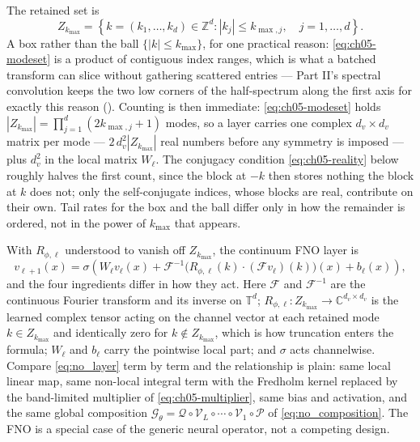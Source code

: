 The retained set is
\begin{equation}
  \label{eq:ch05-modeset}
  Z_{k_{\max}} = \left\{ k = (k_1, \dots, k_d) \in \mathbb{Z}^d : |k_j| \le k_{\max, j}, \quad j = 1, \dots, d \right\}.
\end{equation}
A box rather than the ball $\{|k|\le k_{\max}\}$, for one practical reason:
\eqref{eq:ch05-modeset} is a product of contiguous index ranges, which is what
a batched transform can slice without gathering scattered entries --- Part
II's spectral convolution keeps the two low corners of the half-spectrum along
the first axis for exactly this reason ().
Counting is then immediate: \eqref{eq:ch05-modeset} holds
$\textstyle|Z_{k_{\max}}| = \prod_{j=1}^d (2k_{\max,j}+1)$ modes, so a layer
carries one complex $d_v \times d_v$ matrix per mode --- $2\,d_v^2
|Z_{k_{\max}}|$ real numbers before any symmetry is imposed --- plus $d_v^2$ in
the local matrix $W_\ell$. The conjugacy condition \eqref{eq:ch05-reality} below
roughly halves the first count, since the block at $-k$ then stores nothing the
block at $k$ does not; only the self-conjugate indices, whose blocks are real,
contribute on their own. Tail rates for the box and the ball
differ only in how the remainder is ordered, not in the power of
$k_{\max}$ that appears.

With $R_{\phi,\ell}$ understood to vanish off $Z_{k_{\max}}$, the continuum FNO
layer is
\begin{equation}
  \label{eq:fno_layer}
  v_{\ell+1}(x) = \sigma\left( W_\ell v_\ell(x) + \mathcal{F}^{-1}\Big( R_{\phi, \ell}(k) \cdot (\mathcal{F} v_\ell)(k) \Big)(x) + b_\ell(x) \right),
\end{equation}
and the four ingredients differ in how they act. Here
$\mathcal{F}$ and $\mathcal{F}^{-1}$ are the continuous Fourier transform and
its inverse on $\mathbb{T}^d$; $R_{\phi,\ell} : Z_{k_{\max}} \to
\mathbb{C}^{d_v \times d_v}$ is the learned complex tensor acting on the
channel vector at each retained mode $k \in Z_{k_{\max}}$ and identically zero
for $k \notin Z_{k_{\max}}$, which is how truncation enters the formula;
$W_\ell$ and $b_\ell$ carry the pointwise local part; and $\sigma$ acts
channelwise. Compare \eqref{eq:no_layer} term by term and the relationship is
plain: same local linear map, same non-local integral term with the Fredholm
kernel replaced by the band-limited multiplier of
\eqref{eq:ch05-multiplier}, same bias and activation, and the same global
composition $\mathcal{G}_\theta = \mathcal{Q}\circ\mathcal{V}_L\circ\cdots\circ\mathcal{V}_1\circ\mathcal{P}$
of \eqref{eq:no_composition}. The FNO is a special case of the generic neural
operator, not a competing design.

